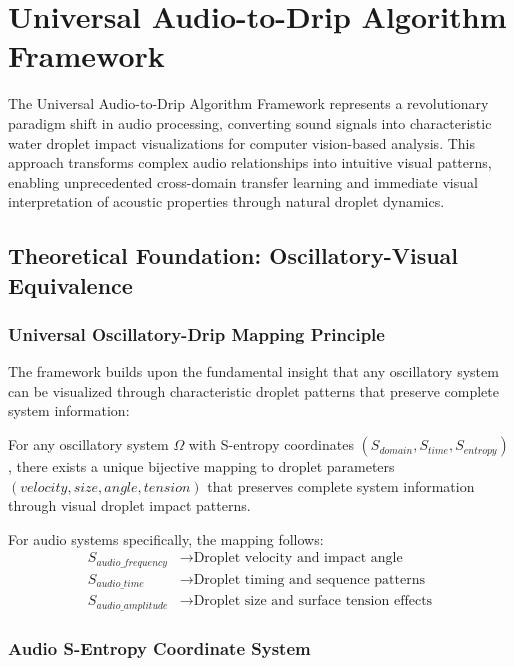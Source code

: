 \section{Universal Audio-to-Drip Algorithm Framework}

The Universal Audio-to-Drip Algorithm Framework represents a revolutionary paradigm shift in audio processing, converting sound signals into characteristic water droplet impact visualizations for computer vision-based analysis. This approach transforms complex audio relationships into intuitive visual patterns, enabling unprecedented cross-domain transfer learning and immediate visual interpretation of acoustic properties through natural droplet dynamics.

\subsection{Theoretical Foundation: Oscillatory-Visual Equivalence}

\subsubsection{Universal Oscillatory-Drip Mapping Principle}

The framework builds upon the fundamental insight that any oscillatory system can be visualized through characteristic droplet patterns that preserve complete system information:

\begin{principle}
For any oscillatory system $\Omega$ with S-entropy coordinates $(S_{domain}, S_{time}, S_{entropy})$, there exists a unique bijective mapping to droplet parameters $(velocity, size, angle, tension)$ that preserves complete system information through visual droplet impact patterns.
\end{principle}

For audio systems specifically, the mapping follows:
\begin{align}
S_{audio\_frequency} &\rightarrow \text{Droplet velocity and impact angle} \\
S_{audio\_time} &\rightarrow \text{Droplet timing and sequence patterns} \\
S_{audio\_amplitude} &\rightarrow \text{Droplet size and surface tension effects}
\end{align}

\subsubsection{Audio S-Entropy Coordinate System}

